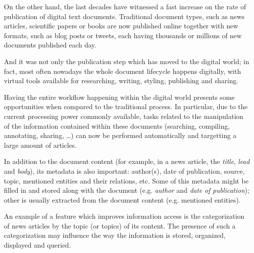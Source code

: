 \documentclass[conference]{IEEEtran}
\begin{document}
On the other hand, the last decades have witnessed a fast increase on
the rate of publication of digital text documents. Traditional
document types, such as news articles, scientific papers or books are
now published online together with new formats, such as blog posts or
tweets, each having thousands or millions of new documents published
each day.

And it was not only the publication step which has moved to the
digital world; in fact, most often nowadays the whole document
lifecycle happens digitally, with virtual tools available for
researching, writing, styling, publishing and sharing.

Having the entire workflow happening within the digital world presents
some opportunities when compared to the traditional process. In
particular, due to the current processing power commonly available,
tasks related to the manipulation of the information contained within
these documents (searching, compiling, annotating, sharing, \dots) can
now be performed automatically and targetting a large amount of
articles.

In addition to the document content (for example, in a news article,
the \emph{title}, \emph{lead} and \emph{body}), its metadata is also
important: author(s), date of publication, source, topic, mentioned
entities and their relations, etc. Some of this metadata might be
filled in and stored along with the document (e.g. \emph{author} and
\emph{date of publication}); other is usually extracted from the
document content (e.g. mentioned entities).

An example of a feature which improves information access is the
categorization of news articles by the topic (or topics) of its
content. The presence of such a categorization may influence the way
the information is stored, organized, displayed and queried.
\end{document}
